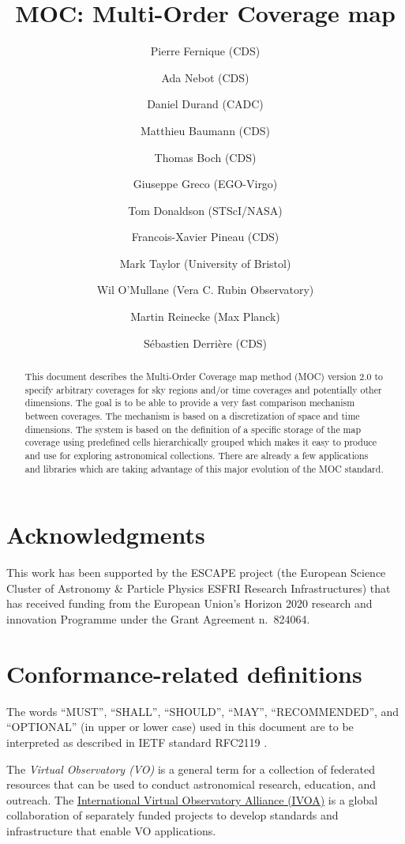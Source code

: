 \documentclass[11pt,a4paper]{ivoa}
\title{MOC: Multi-Order Coverage map}
\author{Pierre Fernique (CDS)}
\author{Ada Nebot (CDS)}
\author{Daniel Durand (CADC)}
\author{Matthieu Baumann (CDS)}
\author{Thomas Boch (CDS)}
\author{Giuseppe Greco (EGO-Virgo)}
\author{Tom Donaldson (STScI/NASA)}
\author{Francois-Xavier Pineau (CDS)}
\author{Mark Taylor (University of Bristol)}
\author{Wil O'Mullane (Vera C. Rubin Observatory)}
\author{Martin Reinecke (Max Planck)}
\author{S\'{e}bastien Derri\`{e}re (CDS)}
\begin{document}
\begin{abstract}
This document describes the Multi-Order Coverage map method (MOC)
version 2.0 to specify arbitrary coverages for sky regions and/or time
coverages and potentially other dimensions. The goal is to be able to
provide a very fast comparison mechanism between coverages. The
mechanism is based on a discretization of space and time
dimensions. The system is based on the definition of a specific storage
of the map coverage using predefined cells hierarchically grouped
which makes it easy to produce and use for exploring astronomical
collections. There are already a few applications and libraries which
are taking advantage of this major evolution of the MOC standard. 
\end{abstract}

\listoffigures
\listoftables  


\section*{Acknowledgments}
This work has been supported by the ESCAPE project (the European
Science Cluster of Astronomy \& Particle Physics ESFRI Research
Infrastructures) that has received funding from the European Union's
Horizon 2020 research and innovation Programme under the Grant
Agreement n.\ 824064.

\section*{Conformance-related definitions}
The words ``MUST'', ``SHALL'', ``SHOULD'', ``MAY'', ``RECOMMENDED'',
and ``OPTIONAL'' (in upper or lower case) used in this document are to
be interpreted as described in IETF standard RFC2119
\citep{std:RFC2119}.

The \emph{Virtual Observatory (VO)} is a general term for a collection
of federated resources that can be used to conduct astronomical
research, education, and outreach.  The
\href{http://www.ivoa.net}{International Virtual Observatory Alliance
  (IVOA)} is a global collaboration of separately funded projects to
develop standards and infrastructure that enable VO applications.
\end{document}
